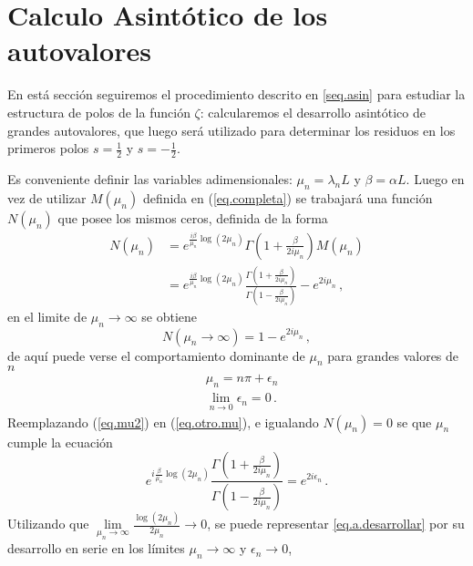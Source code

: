\section{Calculo Asintótico de los autovalores}\label{seq.2.asin}

En está sección seguiremos el procedimiento descrito en \ref{seq.asin} para estudiar la estructura de polos de la función $\zeta$: calcularemos el desarrollo asintótico de grandes autovalores, que luego será utilizado para determinar los residuos en los primeros polos $s= \frac{1}{2}$ y $s= - \frac{1}{2}$.



Es conveniente definir las variables adimensionales: $\mu _n = \lambda _nL $ y $\beta = \alpha L$. Luego en vez de utilizar $M (\mu _n)$ definida en (\ref{eq.completa}) se trabajará una función $N (\mu _n)$ que posee los mismos ceros, definida de la forma
\begin{align}
\nonumber
N (\mu _n) &=
e ^{\frac{i \beta }{\mu _n} \log(2 \mu _n) }
\Gamma \left( 1 + \frac{ \beta}{2 i \mu _n} \right)
M (\mu _n) \\ 
&=  
e ^{\frac{i \beta }{\mu _n} \log(2 \mu _n) }
\frac{\Gamma \left(1 + \frac{ \beta}{2 i \mu _n} \right)}
	{\Gamma \left(1 - \frac{ \beta}{2 i \mu _n} \right)}
- e ^{2 i \mu _n}
\, ,
\label{eq.otro.mu}
\end{align}
en el limite de $\mu _n \rightarrow \infty$ se obtiene
\begin{equation}
    N(\mu _n  \rightarrow \infty) = 
	1 - e ^{2 i \mu _n}
		\, ,
\end{equation}
de aquí puede verse el comportamiento dominante  de $\mu _n$ para grandes valores de $n$
\begin{equation}
\begin{aligned}
    &\mu _n = n \pi + \epsilon _n \\[5pt]
	&\lim \limits _{n \rightarrow{0}} \epsilon _n  = 0
		\, .
\end{aligned}
\label{eq.mu2}
\end{equation}
Reemplazando (\ref{eq.mu2}) en (\ref{eq.otro.mu}), e igualando $N (\mu _n) = 0$ se que $\mu _n$ cumple la ecuación
\begin{equation}
	e ^{ i \frac{\beta}{ \mu _n} \log (2 \mu _n)}     
    \frac{\Gamma(1 + \frac{ \beta}{2  i \mu _n} ) }
    {\Gamma(1 -  \frac{ \beta}{2  i \mu _n} )} =    
    e ^{2 i \epsilon _n }
    	\, .
\label{eq.a.desarrollar}
\end{equation}
Utilizando que  $ \lim \limits_{\mu _n \rightarrow \infty} \frac{\log (2 \mu _n)}{2 \mu _n } \rightarrow 0$, se puede representar \ref{eq.a.desarrollar} por su desarrollo en serie en los límites $ \mu _n \rightarrow \infty $ y $\epsilon _n \rightarrow 0$,
